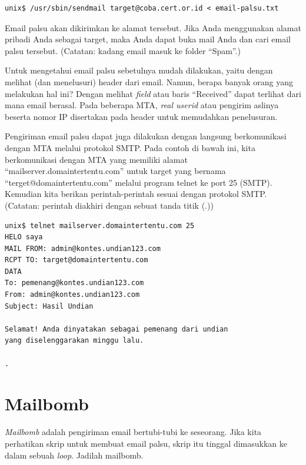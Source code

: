 \begin{mdframed}
\begin{verbatim}
unix$ /usr/sbin/sendmail target@coba.cert.or.id < email-palsu.txt
\end{verbatim}
\end{mdframed}

Email palsu akan dikirimkan ke alamat tersebut. Jika Anda menggunakan alamat
pribadi Anda sebagai target, maka Anda dapat buka mail Anda dan cari email
palsu tersebut. (Catatan: kadang email masuk ke folder ``Spam''.)

Untuk mengetahui email palsu sebetulnya mudah dilakukan, yaitu dengan melihat
(dan menelusuri) header dari email. Namun, berapa banyak orang yang melakukan
hal ini? Dengan melihat {\em field} atau baris ``Received'' dapat terlihat dari
mana email berasal. Pada beberapa MTA, {\em real userid} atau pengirim aslinya
beserta nomor IP disertakan pada header untuk memudahkan penelusuran.


Pengiriman email palsu dapat juga dilakukan dengan langsung berkomunikasi
dengan MTA melalui protokol SMTP. Pada contoh di bawah ini, kita berkomunikasi
dengan MTA yang memiliki alamat ``mailserver.domaintertentu.com'' untuk target
yang bernama ``terget@domaintertentu.com'' melalui program telnet ke port 25
(SMTP). Kemudian kita berikan perintah-perintah sesuai dengan protokol SMTP.
(Catatan: perintah diakhiri dengan sebuat tanda titik (.))

\begin{verbatim}
unix$ telnet mailserver.domaintertentu.com 25
HELO saya
MAIL FROM: admin@kontes.undian123.com
RCPT TO: target@domaintertentu.com
DATA
To: pemenang@kontes.undian123.com                                               
From: admin@kontes.undian123.com                                                
Subject: Hasil Undian                                                           
                                                                                
Selamat! Anda dinyatakan sebagai pemenang dari undian                           
yang diselenggarakan minggu lalu.  

.
\end{verbatim}

\section{Mailbomb}
{\em Mailbomb} adalah pengiriman email bertubi-tubi ke seseorang. Jika kita
perhatikan skrip untuk membuat email palsu, skrip itu tinggal dimasukkan ke
dalam sebuah {\em loop}. Jadilah mailbomb.

